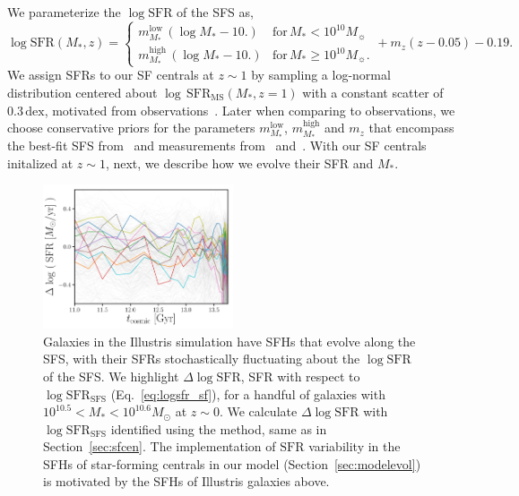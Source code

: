 \documentclass[12pt, letterpaper, preprint, tighten]{aastex62}
\newcommand{\beq}{\begin{equation}}
\newcommand{\eeq}{\end{equation}}
\newcommand{\logsfr}{\log\mathrm{SFR}}
\newcommand{\logsfrsfs}{\log\mathrm{SFR}_\mathrm{SFS}}
\begin{document}
We parameterize the $\log\mathrm{SFR}$ of the SFS as, 
\beq \label{eq:logsfr_ms}
\logsfr(M_*, z) =  \begin{cases}
m^\mathrm{low}_{M_*}\,(\log M_* - 10.)  & \text{for}\,M_* < 10^{10}M_\sun \\
m^\mathrm{high}_{M_*}\,(\log M_* - 10.)  & \text{for}\,M_* \geq 10^{10}M_\sun.
\end{cases}
+ m_z (z - 0.05) - 0.19.
\eeq
We assign SFRs to our SF centrals at $z\sim1$ by sampling a log-normal 
distribution centered about $\log\,\mathrm{SFR}_\mathrm{MS}(M_*, z=1)$ 
with a constant scatter of $0.3\,\mathrm{dex}$, motivated from 
observations~\citep{daddi2007, noeske2007, magdis2012, whitaker2012}.
Later when comparing to observations, we choose conservative priors 
for the parameters $m^\mathrm{low}_{M_*}$, $m^\mathrm{high}_{M_*}$ and $m_z$
that encompass the best-fit SFS from~\cite{speagle2014} and measurements 
from~\cite{moustakas2013} and~\cite{lee2015}. With our SF centrals initalized 
at $z \sim 1$, next, we describe how we evolve their SFR and $M_*$.

\begin{figure}
\begin{center}
\includegraphics[width=0.5\textwidth]{figs/illustris_sfh.pdf} 
    \caption{Galaxies in the Illustris simulation have SFHs that evolve along the
    SFS, with their SFRs stochastically fluctuating about the $\logsfr$ of the SFS.
    We highlight $\Delta \logsfr$, SFR with respect to $\logsfrsfs$ (Eq.~\ref{eq:logsfr_sf}), 
    for a handful of galaxies with $10^{10.5}< M_* < 10^{10.6}M_\odot$ at $z\sim0$. 
    We calculate $\Delta \logsfr$ with $\logsfrsfs$ identified using the \cite{hahn2018a} 
    method, same as in Section~\ref{sec:sfcen}. The implementation of $\mathrm{SFR}$
    variability in the SFHs of star-forming centrals in our model 
    (Section~\ref{sec:modelevol}) is motivated by the SFHs of Illustris galaxies above.}
\label{fig:illsfh}
\end{center}
\end{figure}
\end{document}
